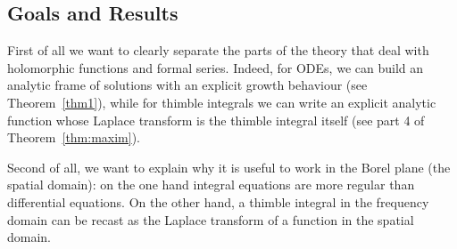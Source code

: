 \documentclass{article}
\theoremstyle{definition}
\newcommand{\laplace}{\mathcal{L}}
\newcommand{\borel}{\mathcal{B}}
\begin{document}



\subsection{Goals and Results}

First of all we want to clearly separate the parts of the theory that deal with holomorphic functions and formal series. Indeed, for ODEs, we can build an analytic frame of solutions with an explicit growth behaviour (see Theorem~\ref{thm1}), while for thimble integrals we can write an explicit analytic function whose Laplace transform is the thimble integral itself (see part 4 of Theorem~\ref{thm:maxim}). 

Second of all, we want to explain why it is useful to work in the Borel plane (the spatial domain): on the one hand integral equations are more regular than differential equations. On the other hand, a thimble integral in the frequency domain can be recast as the Laplace transform of a function in the spatial domain. 
\end{document}
